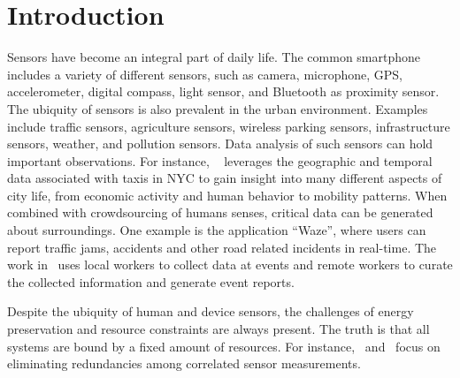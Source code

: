 \documentclass{acm_proc_article-sp}
\begin{document}
\section{Introduction}
Sensors have become an integral part of daily life. The common smartphone includes a variety of different sensors, such as camera, microphone, GPS, accelerometer, digital compass, light sensor, and Bluetooth as proximity sensor. The ubiquity of sensors is also prevalent in the urban environment. Examples include traffic sensors, agriculture sensors, wireless parking sensors, infrastructure sensors, weather, and pollution sensors. Data analysis of such sensors can hold important observations. For instance, ~\cite{ferreira2013visual} leverages the geographic and temporal data associated with taxis in NYC to gain insight into many different aspects of city life, from economic activity and human behavior to mobility patterns. When combined with crowdsourcing of humans senses, critical data can be generated about surroundings. One example is the application ``Waze'', where users can report traffic jams, accidents and other road related incidents in real-time. The work in~\cite{agapie2015crowdsourcing} uses local workers to collect data at events and remote workers to curate the collected information and generate event reports.\par

Despite the ubiquity of human and device sensors, the challenges of energy preservation and resource constraints are always present. The truth is that all systems are bound by a fixed amount of resources. For instance,~\cite{marco2003many} and~\cite{pattem2008impact} focus on eliminating redundancies among correlated sensor measurements. \par
\end{document}
